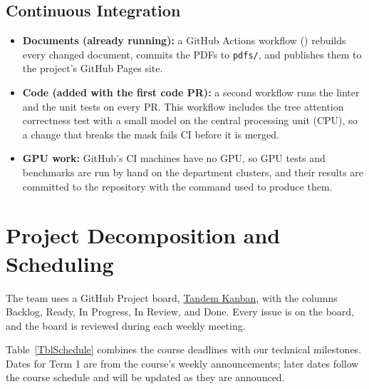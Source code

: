 \documentclass{article}
\begin{document}
\subsection{Continuous Integration}

\begin{itemize}
  \item \textbf{Documents (already running):} a GitHub Actions workflow
  () rebuilds every changed
  document, commits the PDFs to \texttt{pdfs/}, and publishes them to the
  project's GitHub Pages site.
  \item \textbf{Code (added with the first code PR):} a second workflow
  runs the linter and the unit tests on every PR. This workflow includes the
  tree
  attention correctness test with a small model on the central processing
  unit (CPU), so a change that
  breaks the mask fails CI before it is merged.
  \item \textbf{GPU work:} GitHub's CI machines have no GPU, so GPU tests
  and benchmarks are run by hand on the department clusters, and their
  results are committed to the repository with the command used to produce
  them.
\end{itemize}

\section{Project Decomposition and Scheduling}

The team uses a GitHub Project board,
\href{https://github.com/users/jjustin-k/projects/11}{Tandem Kanban}, with
the columns Backlog, Ready, In Progress, In Review, and Done. Every issue is
on the board, and the board is reviewed during each weekly meeting.

Table~\ref{TblSchedule} combines the course deadlines with our technical
milestones. Dates for Term 1 are from the course's weekly announcements;
later dates follow the course schedule and will be updated as they are
announced.
\end{document}
